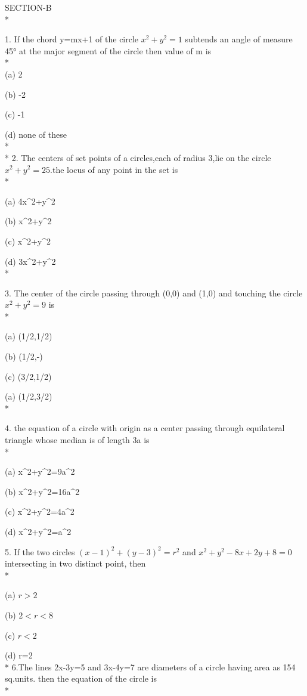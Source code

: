 \documentclass{article}
\begin{document}
{\LARGE SECTION-B }\\*

1. If the chord y=mx+1 of the circle $x^2+y^2=1$ subtends an angle of measure 45° at the major segment of the circle then value of m is\\*\\

\choice (a) 2\pm{}

\choice (b) -2\pm{}

\choice (c) -1\pm{}

\choice (d) none of these\\*\\*
2. The centers of set points of a circles,each of radius 3,lie on the circle $x^2+y^2=25$.the locus of any point in the set is\\*

\choice (a) 4\leq x^2+y^2 

\choice (b)  x^2+y^2 

\choice (c) x^2+y^2 

\choice (d) 3\leq x^2+y^2 \\*

3. The center of the circle passing through (0,0) and (1,0) and touching the circle $x^2+y^2=9$ is\\*

\choice (a) (1/2,1/2)

\choice (b) (1/2,-)

\choice (c) (3/2,1/2)

\choice (a) (1/2,3/2)\\*

4. the equation of a circle with origin as a center passing through equilateral triangle whose median is of length 3a is\\*

\choice (a) x^2+y^2=9a^2

\choice (b) x^2+y^2=16a^2

\choice (c) x^2+y^2=4a^2

\choice (d) x^2+y^2=a^2

5. If the two circles $(x-1)^2+(y-3)^2=r^2$ and $x^2+y^2-8x+2y+8=0$ intersecting in two distinct point, then\\*

\choice (a) $r > 2$

\choice (b) $2< r < 8$

\choice (c) $ r < 2$

\choice (d) r=2\\*
6.The lines 2x-3y=5 and 3x-4y=7 are diameters of a circle having area as 154 sq.units. then the equation of the circle is\\*
\end{document}
